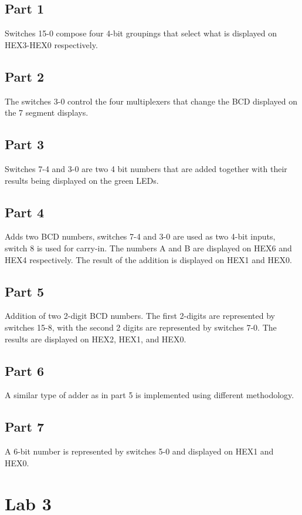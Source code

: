 \documentclass[oneside,letterpaper,12pt,titlepage]{article}
\begin{document}
\subsection{Part 1}
Switches 15-0 compose four 4-bit groupings that select what is displayed on HEX3-HEX0 respectively.

\subsection{Part 2}
The switches 3-0 control the four multiplexers that change the BCD displayed on the 7 segment displays.

\subsection{Part 3}
Switches 7-4 and 3-0 are two 4 bit numbers that are added together with their results being displayed on the green LEDs.

\subsection{Part 4}
Adds two BCD numbers, switches 7-4 and 3-0 are used as two 4-bit inputs, switch 8 is used for carry-in. The numbers A and B are displayed on HEX6 and HEX4 respectively. The result of the addition is displayed on HEX1 and HEX0. 

\subsection{Part 5}
Addition of two 2-digit BCD numbers. The first 2-digits are represented by switches 15-8, with the second 2 digits are represented by switches 7-0. The results are displayed on HEX2, HEX1, and HEX0.

\subsection{Part 6}
A similar type of adder as in part 5 is implemented using different methodology.

\subsection{Part 7}
A 6-bit number is represented by switches 5-0 and displayed on HEX1 and HEX0.

\section{Lab 3}
\end{document}
